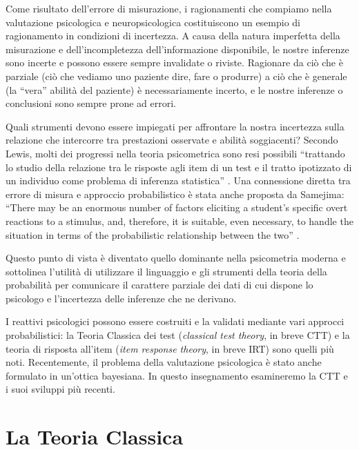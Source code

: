 \documentclass[
  11pt,
]{krantz}
\theoremstyle{definition}
\theoremstyle{definition}
\theoremstyle{definition}
\theoremstyle{definition}
\theoremstyle{remark}
\begin{document}
Come risultato dell'errore di misurazione, i ragionamenti che compiamo nella valutazione psicologica e neuropsicologica costituiscono un esempio di ragionamento in condizioni di incertezza. A causa della natura imperfetta della misurazione e dell'incompletezza dell'informazione disponibile, le nostre inferenze sono incerte e possono essere sempre invalidate o riviste. Ragionare da ciò che è parziale (ciò che vediamo uno paziente dire, fare o produrre) a ciò che è generale (la ``vera'' abilità del paziente) è necessariamente incerto, e le nostre inferenze o conclusioni sono sempre prone ad errori.

Quali strumenti devono essere impiegati per affrontare la nostra incertezza sulla relazione che intercorre tra prestazioni osservate e abilità soggiacenti? Secondo Lewis, molti dei progressi nella teoria psicometrica sono resi possibili ``trattando lo studio della relazione tra le risposte agli item di un test e il tratto ipotizzato di un individuo come problema di inferenza statistica'' \citep{lewis1986test}. Una connessione diretta tra errore di misura e approccio probabilistico è stata anche proposta da Samejima: ``There may be an enormous number of factors eliciting a student's specific overt reactions to a stimulus, and, therefore, it is suitable, even necessary, to handle the situation in terms of the probabilistic relationship between the two'' \citep{samejima1983constant}.

Questo punto di vista è diventato quello dominante nella psicometria moderna e sottolinea l'utilità di utilizzare il linguaggio e gli strumenti della teoria della probabilità per comunicare il carattere parziale dei dati di cui dispone lo psicologo e l'incertezza delle inferenze che ne derivano.

I reattivi psicologici possono essere costruiti e la validati mediante vari approcci probabilistici: la Teoria Classica dei test (\emph{classical test theory}, in breve CTT) e la teoria di risposta all'item (\emph{item response theory}, in breve IRT) sono quelli più noti. Recentemente, il problema della valutazione psicologica è stato anche formulato in un'ottica bayesiana. In questo insegnamento esamineremo la CTT e i suoi sviluppi più recenti.

\hypertarget{la-teoria-classica}{%
\section{La Teoria Classica}\label{la-teoria-classica}}
\end{document}
